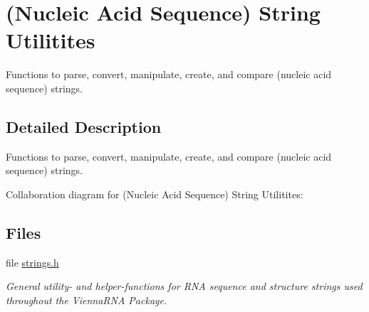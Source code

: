 \hypertarget{group__string__utils}{}\section{(Nucleic Acid Sequence) String Utilitites}
\label{group__string__utils}


Functions to parse, convert, manipulate, create, and compare (nucleic acid sequence) strings.  




\subsection{Detailed Description}
Functions to parse, convert, manipulate, create, and compare (nucleic acid sequence) strings. 

Collaboration diagram for (Nucleic Acid Sequence) String Utilitites\+:
\subsection*{Files}
\begin{DoxyCompactItemize}
\item 
file \mbox{\hyperlink{strings_8h}{strings.\+h}}
\begin{DoxyCompactList}\small\item\em General utility-\/ and helper-\/functions for R\+NA sequence and structure strings used throughout the Vienna\+R\+NA Package. \end{DoxyCompactList}\end{DoxyCompactItemize}
